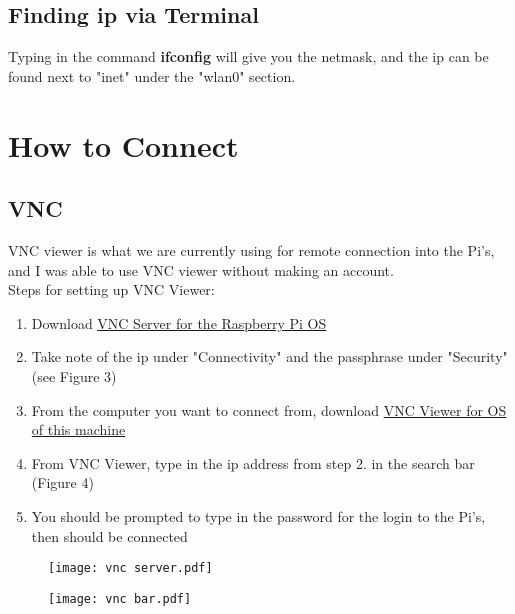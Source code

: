 \documentclass[12pt]{extarticle}
\begin{document}
\subsection{Finding ip via Terminal}
Typing in the command \textbf{ifconfig} will give you the netmask, and the ip can be found next to "inet" under the "wlan0" section.

\newpage
\section{How to Connect}
\subsection{VNC}
VNC viewer is what we are currently using for remote connection into the Pi's, and I was able to use VNC viewer without making an account. \\

Steps for setting up VNC Viewer:
\begin{enumerate}
  \item Download \href{https://www.realvnc.com/en/connect/download/vnc/}{VNC Server for the Raspberry Pi OS}
  \item Take note of the ip under "Connectivity" and the passphrase under "Security" (see Figure 3)
  \item From the computer you want to connect from, download \href{https://www.realvnc.com/en/connect/download/viewer/}{VNC Viewer for OS of this machine} 
  \item From VNC Viewer, type in the ip address from step 2. in the search bar (Figure 4)
  \item You should be prompted to type in the password for the login to the Pi's, then should be connected
\end{enumerate}
\begin{figure}[ht]
    \centering
    \texttt{[image: vnc server.pdf]}
    \caption{}
\end{figure}
\newpage
\begin{figure}[ht]
    \centering
    \texttt{[image: vnc bar.pdf]}
    \caption{}
\end{figure}
\end{document}
